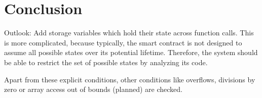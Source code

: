 \section{Conclusion}
\label{section:conclusion}

Outlook: Add storage variables which hold their state across function calls.
This is more complicated, because typically, the smart contract is not designed
to assume all possible states over its potential lifetime. Therefore, the
system should be able to restrict the set of possible states by analyzing
its code.

Apart from these explicit conditions, other conditions like overflows,
divisions by zero or array access out of bounds (planned) are checked.
